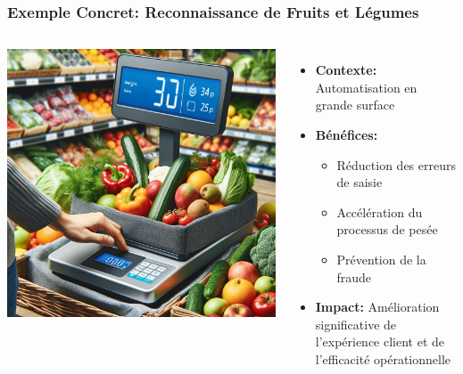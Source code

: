 \documentclass{beamer}
\begin{document}
\begin{frame}
    \frametitle{Exemple Concret: Reconnaissance de Fruits et Légumes}
    \begin{columns}
        \includegraphics[width=\textwidth]{images/pesee_fruits_legumes.png}
        \begin{itemize}
            \item \textbf{Contexte:} Automatisation en grande surface
            \item \textbf{Bénéfices:}
            \begin{itemize}
                \item Réduction des erreurs de saisie
                \item Accélération du processus de pesée
                \item Prévention de la fraude
            \end{itemize}
            \item \textbf{Impact:} Amélioration significative de l'expérience client et de l'efficacité opérationnelle
        \end{itemize}
    \end{columns}
\end{frame}
\end{document}
